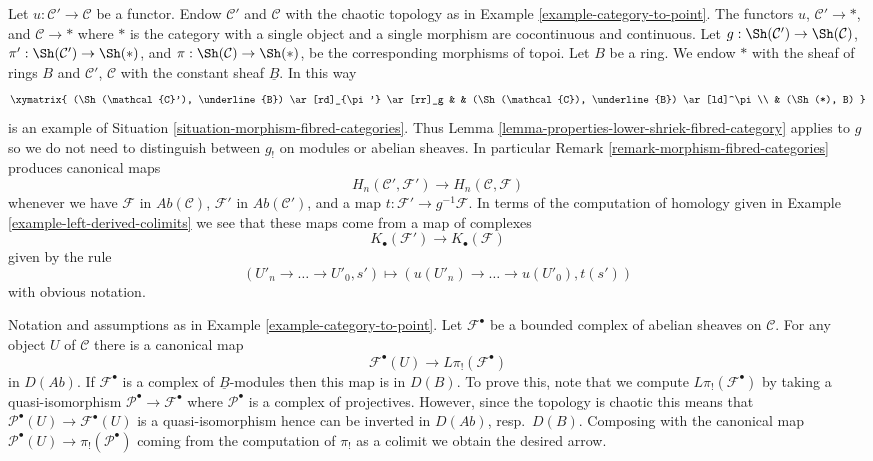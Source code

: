 \begin{example}
\label{example-morphism-categories}
Let $u : \mathcal{C}' \to \mathcal{C}$ be a functor.
Endow $\mathcal{C}'$ and $\mathcal{C}$ with the chaotic
topology as in Example \ref{example-category-to-point}.
The functors $u$, $\mathcal{C}' \to *$, and $\mathcal{C} \to *$
where $*$ is the category with a single object and a single morphism
are cocontinuous and continuous. Let
$g : \Sh(\mathcal{C}') \to \Sh(\mathcal{C})$,
$\pi' : \Sh(\mathcal{C}') \to \Sh(*)$, and
$\pi : \Sh(\mathcal{C}) \to \Sh(*)$,
be the corresponding morphisms of topoi.
Let $B$ be a ring. We endow $*$ with the sheaf of rings $B$ and
$\mathcal{C}'$, $\mathcal{C}$ with the constant sheaf $\underline{B}$.
In this way
$$
\xymatrix{
(\Sh(\mathcal{C}'), \underline{B}) \ar[rd]_{\pi'} \ar[rr]_g & &
(\Sh(\mathcal{C}), \underline{B}) \ar[ld]^\pi \\
& (\Sh(*), B)
}
$$
is an example of Situation \ref{situation-morphism-fibred-categories}.
Thus
Lemma \ref{lemma-properties-lower-shriek-fibred-category}
applies to $g$ so we do not need to distinguish between $g_!$ on
modules or abelian sheaves. In particular
Remark \ref{remark-morphism-fibred-categories}
produces canonical maps
$$
H_n(\mathcal{C}', \mathcal{F}')
\longrightarrow
H_n(\mathcal{C}, \mathcal{F})
$$
whenever we have $\mathcal{F}$ in $\textit{Ab}(\mathcal{C})$,
$\mathcal{F}'$ in $\textit{Ab}(\mathcal{C}')$,
and a map $t : \mathcal{F}' \to g^{-1}\mathcal{F}$. In terms of the
computation of homology given in
Example \ref{example-left-derived-colimits}
we see that these maps come from a map of complexes
$$
K_\bullet(\mathcal{F}') \longrightarrow K_\bullet(\mathcal{F})
$$
given by the rule
$$
(U'_n \to \ldots \to U'_0, s') \longmapsto
(u(U'_n) \to \ldots \to u(U'_0), t(s'))
$$
with obvious notation.
\end{example}

\begin{remark}
\label{remark-map-evaluation-to-derived}
Notation and assumptions as in Example \ref{example-category-to-point}.
Let $\mathcal{F}^\bullet$ be a bounded complex of abelian sheaves on
$\mathcal{C}$. For any object $U$ of $\mathcal{C}$ there is a canonical
map
$$
\mathcal{F}^\bullet(U) \longrightarrow L\pi_!(\mathcal{F}^\bullet)
$$
in $D(\textit{Ab})$. If $\mathcal{F}^\bullet$ is a complex of
$\underline{B}$-modules then this map is in $D(B)$. To prove this, note
that we compute $L\pi_!(\mathcal{F}^\bullet)$ by taking a quasi-isomorphism
$\mathcal{P}^\bullet \to \mathcal{F}^\bullet$ where $\mathcal{P}^\bullet$
is a complex of projectives. However, since the topology is chaotic
this means that $\mathcal{P}^\bullet(U) \to \mathcal{F}^\bullet(U)$
is a quasi-isomorphism hence can be inverted in
$D(\textit{Ab})$, resp.\ $D(B)$. Composing with the canonical map
$\mathcal{P}^\bullet(U) \to \pi_!(\mathcal{P}^\bullet)$ coming from
the computation of $\pi_!$ as a colimit we obtain the desired arrow.
\end{remark}

